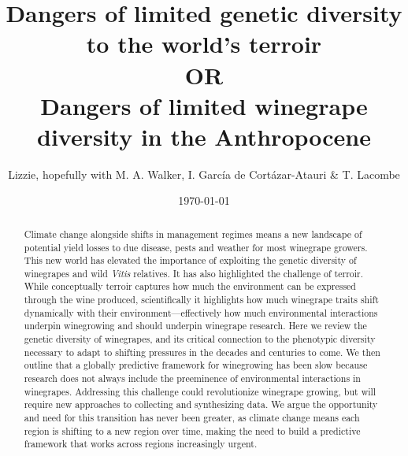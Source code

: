 \documentclass[11pt]{article}
\begin{document}

\renewcommand{\refname}{\CHead{}}

\title{Dangers of limited genetic diversity to the world's terroir \\ OR \\ Dangers of limited winegrape diversity in the Anthropocene}
\author{Lizzie, hopefully with M. A. Walker, I. Garc\'ia de Cort\'azar-Atauri \& T. Lacombe}
\date{\today}
\maketitle





\begin{abstract}
Climate change alongside shifts in management regimes means a new landscape of potential yield losses to due disease, pests and weather for most winegrape growers. This new world has elevated the importance of exploiting the genetic diversity of winegrapes and wild \emph{Vitis} relatives. It has also highlighted the challenge of terroir. While conceptually terroir captures how much the environment can be expressed through the wine produced, scientifically it highlights how much winegrape traits shift dynamically with their environment---effectively how much environmental interactions underpin winegrowing and should underpin winegrape research. Here we review the genetic diversity of winegrapes, and its critical connection to the phenotypic diversity necessary to adapt to shifting pressures in the decades and centuries to come. We then outline that a globally predictive framework for winegrowing has been slow because research does not always include the preeminence of environmental interactions in winegrapes. Addressing this challenge could revolutionize winegrape growing, but will require new approaches to collecting and synthesizing data. We argue the opportunity and need for this transition has never been greater, as climate change means each region is shifting to a new region over time, making the need to build a predictive framework that works across regions increasingly urgent. %
\end{abstract}
\end{document}

